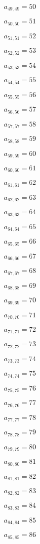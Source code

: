 \documentclass[a4paper,12pt]{article}
\begin{document}
$a _{ 49, 49 } = 50$

$a _{ 50, 50 } = 51$

$a _{ 51, 51 } = 52$

$a _{ 52, 52 } = 53$

$a _{ 53, 53 } = 54$

$a _{ 54, 54 } = 55$

$a _{ 55, 55 } = 56$

$a _{ 56, 56 } = 57$

$a _{ 57, 57 } = 58$

$a _{ 58, 58 } = 59$

$a _{ 59, 59 } = 60$

$a _{ 60, 60 } = 61$

$a _{ 61, 61 } = 62$

$a _{ 62, 62 } = 63$

$a _{ 63, 63 } = 64$

$a _{ 64, 64 } = 65$

$a _{ 65, 65 } = 66$

$a _{ 66, 66 } = 67$

$a _{ 67, 67 } = 68$

$a _{ 68, 68 } = 69$

$a _{ 69, 69 } = 70$

$a _{ 70, 70 } = 71$

$a _{ 71, 71 } = 72$

$a _{ 72, 72 } = 73$

$a _{ 73, 73 } = 74$

$a _{ 74, 74 } = 75$

$a _{ 75, 75 } = 76$

$a _{ 76, 76 } = 77$

$a _{ 77, 77 } = 78$

$a _{ 78, 78 } = 79$

$a _{ 79, 79 } = 80$

$a _{ 80, 80 } = 81$

$a _{ 81, 81 } = 82$

$a _{ 82, 82 } = 83$

$a _{ 83, 83 } = 84$

$a _{ 84, 84 } = 85$

$a _{ 85, 85 } = 86$
\end{document}
